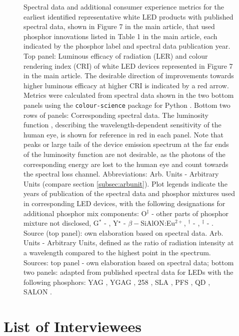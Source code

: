 \documentclass[10pt]{article}
\begin{document}
\begin{figure}[H]
	\caption{Spectral data and additional consumer experience metrics for the earliest identified representative white LED products with published spectral data, shown in Figure 7 in the main article, that used phosphor innovations listed in Table 1 in the main article, each indicated by the phosphor label and spectral data publication year. Top panel: Luminous efficacy of radiation (LER) and colour rendering index (CRI) of white LED devices represented in Figure 7 in the main article. The desirable direction of improvements towards higher luminous efficacy at higher CRI is indicated by a red arrow. Metrics were calculated from spectral data shown in the two bottom panels using the \texttt{colour-science} package for Python \cite{colour-science_software}. Bottom two rows of panels: Corresponding spectral data. The luminosity function \cite{cie-term-lumeff}, describing the wavelength-dependent sensitivity of the human eye, is shown for reference in red in each panel. Note that peaks or large tails of the device emission spectrum at the far ends of the luminosity function are not desirable, as the photons of the corresponding energy are lost to the human eye and count towards the spectral loss channel.  Abbreviations: Arb. Units - Arbitrary Units (compare section \cref{subsec:arbunit}). Plot legends indicate the years of publication of the spectral data and phosphor mixtures used in corresponding LED devices, with the following designations for additional phosphor mix components: O$^\ddagger$ -  other parts of phosphor mixture not disclosed, G$^*$ - , Y$^\star$ - $\beta-$SiAlON:Eu$^{2+}$, $^\dagger$ - , $^\ddagger$ - . Source (top panel): own elaboration based on spectral data. Arb. Units - Arbitrary Units, defined as the ratio of radiation intensity at a wavelength compared to the highest point in the spectrum. Sources: top panel - own elaboration based on spectral data; bottom two panels: adapted from published spectral data for LEDs with the following phosphors: YAG \cite{bando1998development}, YGAG \cite{Mueller2002}, 258 \cite{MuellerMach2005}, SLA \cite{Pust2014}, PFS \cite{trigain_spectrum}, QD \cite{lumileds2016qd}\cite{osram2019qd}, SALON \cite{Hoerder2019}.}
\label{fig:phosphor_spectrum}
\end{figure}

\section{List of Interviewees}
\end{document}
